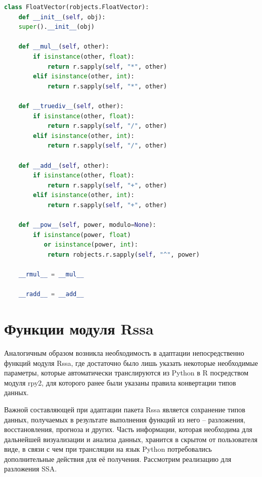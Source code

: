 \documentclass[specialist,
			   substylefile = spbu_report.rtx,
			   subf,href,colorlinks=true, 12pt]{disser}
\begin{document}
\begin{lstlisting}[language=Python, caption=Наследование для FloatVector.]
class FloatVector(robjects.FloatVector):
	def __init__(self, obj):
	super().__init__(obj)
	
	def __mul__(self, other):
		if isinstance(other, float):
			return r.sapply(self, "*", other)
		elif isinstance(other, int):
			return r.sapply(self, "*", other)
	
	def __truediv__(self, other):
		if isinstance(other, float):
			return r.sapply(self, "/", other)
		elif isinstance(other, int):
			return r.sapply(self, "/", other)
	
	def __add__(self, other):
		if isinstance(other, float):
			return r.sapply(self, "+", other)
		elif isinstance(other, int):
			return r.sapply(self, "+", other)
	
 	def __pow__(self, power, modulo=None):
		if isinstance(power, float) 
		   or isinstance(power, int):
			return robjects.r.sapply(self, "^", power)
	
	__rmul__ = __mul__
	
	__radd__ = __add__	
\end{lstlisting}

\section{Функции модуля Rssa}

Аналогичным образом возникла необходимость в адаптации непосредственно функций модуля Rssa, где достаточно было лишь указать некоторые необходимые параметры, которые автоматически транслируются из Python в R посредством модуля rpy2, для которого ранее были указаны правила конвертации типов данных. 

Важной составляющей при адаптации пакета Rssa является сохранение типов данных, получаемых в результате выполнения функций из него – разложения, восстановления, прогноза и других. Часть информации, которая необходима для дальнейшей визуализации и анализа данных, хранится в скрытом от пользователя виде, в связи с чем при трансляции на язык Python потребовались дополнительные действия для её получения. Рассмотрим реализацию для разложения SSA.
\end{document}
